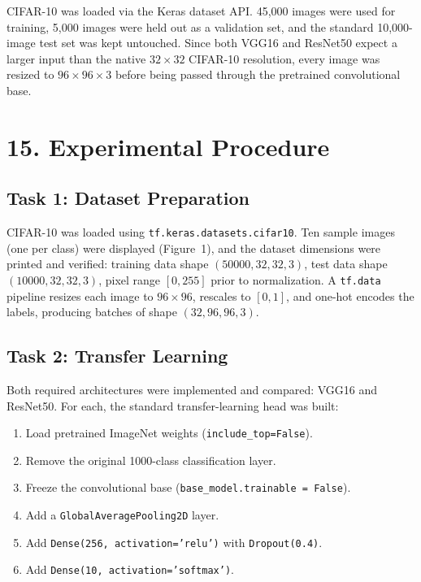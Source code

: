\documentclass[11pt]{article}
\begin{document}
CIFAR-10 was loaded via the Keras dataset API. 45,000 images were
used for training, 5,000 images were held out as a validation set,
and the standard 10,000-image test set was kept untouched. Since
both VGG16 and ResNet50 expect a larger input than the native
$32\times32$ CIFAR-10 resolution, every image was resized to
$96\times96\times3$ before being passed through the pretrained
convolutional base.


\section*{15. Experimental Procedure}

\subsection*{Task 1: Dataset Preparation}

CIFAR-10 was loaded using \texttt{tf.keras.datasets.cifar10}. Ten
sample images (one per class) were displayed (Figure~1), and the
dataset dimensions were printed and verified: training data shape
$(50000,32,32,3)$, test data shape $(10000,32,32,3)$, pixel range
$[0,255]$ prior to normalization. A \texttt{tf.data} pipeline resizes
each image to $96\times96$, rescales to $[0,1]$, and one-hot encodes
the labels, producing batches of shape $(32,96,96,3)$.

\subsection*{Task 2: Transfer Learning}

Both required architectures were implemented and compared: VGG16 and
ResNet50. For each, the standard transfer-learning head was built:

\begin{enumerate}
\item Load pretrained ImageNet weights (\texttt{include\_top=False}).
\item Remove the original 1000-class classification layer.
\item Freeze the convolutional base (\texttt{base\_model.trainable = False}).
\item Add a \texttt{GlobalAveragePooling2D} layer.
\item Add \texttt{Dense(256, activation='relu')} with \texttt{Dropout(0.4)}.
\item Add \texttt{Dense(10, activation='softmax')}.
\end{enumerate}
\end{document}
